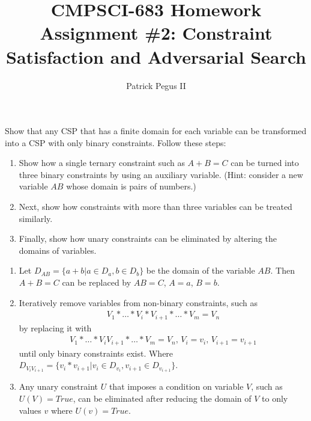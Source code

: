 \documentclass[12pt]{article}
\newenvironment{problem}[2][Problem]{\begin{trivlist}
\item[\hskip \labelsep {\bfseries #1}\hskip \labelsep {\bfseries #2.}]}{\end{trivlist}}
\begin{document}

\title{CMPSCI-683 Homework Assignment \#2: Constraint Satisfaction and Adversarial Search}
\author{Patrick Pegus II}
\maketitle

\begin{problem}{1}
	Show that any CSP that has a finite domain for each variable can be transformed into a CSP with only binary constraints. Follow these steps:
	\begin{enumerate}
		\item Show how a single ternary constraint such as $A+B=C$ can be turned into three binary constraints by using an auxiliary variable.
			(Hint: consider a new variable $AB$ whose domain is pairs of numbers.)
		\item Next, show how constraints with more than three variables can be treated similarly.
		\item Finally, show how unary constraints can be eliminated by altering the domains of variables.
	\end{enumerate}
	\begin{enumerate}
		\item Let $D_{AB}=\{a+b|a \in D_a, b \in D_b\}$ be the domain of the variable $AB$.
			Then $A+B=C$  can be replaced by $AB=C$, $A = a$, $B = b$.
		\item Iteratively remove variables from non-binary constraints, such as
			\begin{align*}
				V_1 * \dots * V_i * V_{i+1} * \dots * V_m = V_n
			\end{align*}
			by replacing it with
			\begin{align*}
				V_1 * \dots * V_iV_{i+1} * \dots *V_m = V_n \text{, } V_i = v_i \text{, } V_{i+1} = v_{i+1}
			\end{align*}
			until only binary constraints exist.
			Where $D_{V_iV_{i+1}} = \{v_i * v_{i+1}| v_i \in D_{v_i}, v_{i+1} \in D_{v_{i+1}}\}$.
		\item Any unary constraint $U$ that imposes a condition on variable $V$, such as $U(V)=True$,
			can be eliminated after reducing the domain of $V$ to only values $v$ where $U(v)=True$.
	\end{enumerate}
\end{problem}
\end{document}

